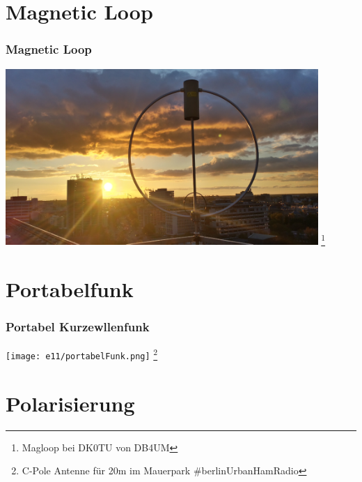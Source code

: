 \section*{Magnetic Loop}

\begin{frame}
    \frametitle{Magnetic Loop}
    \begin{center}
        \includegraphics[width=0.89\textwidth]{e11/Magloop.jpg}
        \footnote{\tiny Magloop bei DK0TU von DB4UM}
	\end{center}
\end{frame}

\section*{Portabelfunk}

\begin{frame}
    \frametitle{Portabel Kurzewllenfunk}
    \begin{center}
        \texttt{[image: e11/portabelFunk.png]}
        \footnote{\tiny C-Pole Antenne für 20m im Mauerpark \#berlinUrbanHamRadio}
	\end{center}
\end{frame}

\section*{Polarisierung}

